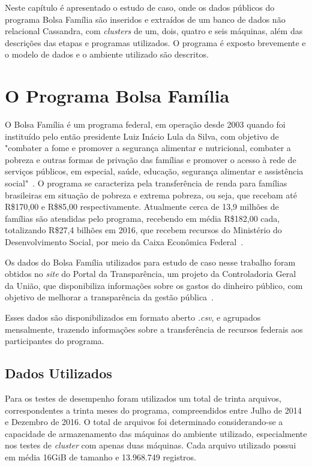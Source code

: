Neste capítulo é apresentado o estudo de caso, onde os dados públicos do programa Bolsa Família são inseridos e extraídos de um banco de dados não relacional Cassandra, com \emph{clusters} de um, dois, quatro e seis máquinas, além das descrições das etapas e programas utilizados. O programa é exposto brevemente e o modelo de dados e o ambiente utilizado são descritos.

\section{O Programa Bolsa Família}
O Bolsa Família é um programa federal, em operação desde 2003 quando foi instituído pelo então presidente Luiz Inácio Lula da Silva, com objetivo de "combater a fome e promover a segurança alimentar e nutricional, combater a pobreza e outras formas de privação das famílias e promover o acesso à rede de serviços públicos, em especial, saúde, educação, segurança alimentar e assistência social"~\cite{caixa-bolsafamilia}. 
O programa se caracteriza pela transferência de renda para famílias brasileiras em situação de pobreza e extrema pobreza, ou seja, que recebam até R\$170,00 e R\$85,00 respectivamente. Atualmente cerca de 13,9 milhões de famílias são atendidas pelo programa, recebendo em média R\$182,00 cada, totalizando R\$27,4 bilhões em 2016, que recebem recursos do Ministério do Desenvolvimento Social, por meio da Caixa Econômica Federal~\cite{gov-bolsafamilia1, gov-bolsafamilia2}.

Os dados do Bolsa Família utilizados para estudo de caso nesse trabalho foram obtidos no \emph{site} do Portal da Transparência, um projeto da Controladoria Geral da União, que disponibiliza informações sobre os gastos do dinheiro público, com objetivo de melhorar a transparência da gestão pública~\cite{sobreportaldatransparencia}. 

Esses dados são disponibilizados em formato aberto \emph{.csv}, e agrupados mensalmente, trazendo informações sobre a transferência de recursos federais aos participantes do programa. 

\subsection{Dados Utilizados}

Para os testes de desempenho foram utilizados um total de trinta arquivos, correspondentes a trinta meses do programa, compreendidos entre Julho de 2014 e Dezembro de 2016. O total de arquivos foi determinado considerando-se a capacidade de armazenamento das máquinas do ambiente utilizado, especialmente nos testes de \emph{cluster} com apenas duas máquinas. Cada arquivo utilizado possui em média 16GiB de tamanho e 13.968.749 registros.

